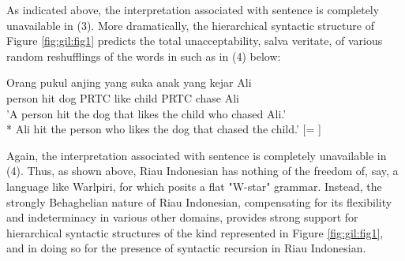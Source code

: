 \documentclass[output=paper,colorlinks,citecolor=brown
]{langscibook}
\begin{document}
As indicated above, the interpretation associated with sentence  is completely unavailable in (3).  More dramatically, the hierarchical syntactic structure of Figure \ref{fig:gil:fig1} predicts the total unacceptability, salva veritate, of various random reshufflings of the words in  such as in (4) below:

\ea
\gll Orang	pukul	anjing	yang	suka	anak	yang	kejar	Ali \\
    person	hit	dog	PRTC	like	child	PRTC	chase	Ali\\
\glt 		'A person hit the dog that likes the child who chased Ali.' \\
*	Ali hit the person who likes the dog that chased the child.' [= ]
\z

Again, the interpretation associated with sentence  is completely unavailable in (4).  Thus, as shown above, Riau Indonesian has nothing of the freedom of, say, a language like Warlpiri, for which \citet{hale1979position, hale1983warlpiri} posits a flat "W-star" grammar. Instead, the strongly Behaghelian nature of Riau Indonesian, compensating for its flexibility and indeterminacy in various other domains, provides strong support for hierarchical syntactic structures of the kind represented in Figure \ref{fig:gil:fig1}, and in doing so for the presence of syntactic recursion in Riau Indonesian.
\end{document}
